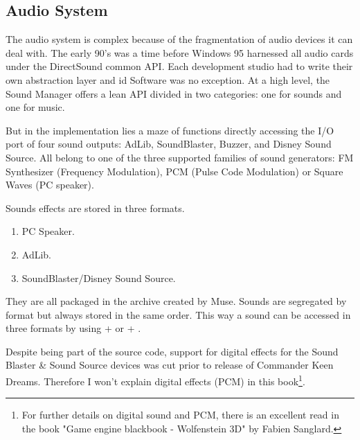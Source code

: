 \documentclass[book.tex]{subfiles}
\begin{document}
\subsection{Audio System}
The audio system is complex because of the fragmentation of audio devices it can deal with. The early 90's was a time before Windows 95 harnessed all audio cards under the DirectSound common API. Each development studio had to write their own abstraction layer and id Software was no exception. At a high level, the Sound Manager offers a lean API divided in two categories: one for sounds and one for music.\\
\par
\begin{minipage}{\textwidth}

\end{minipage}
\par
\begin{minipage}{\textwidth}

\end{minipage}
\par
\vspace{10pt}
But in the implementation lies a maze of functions directly accessing the I/O port of four sound outputs: AdLib, SoundBlaster, Buzzer, and Disney Sound Source. All belong to one of the three supported families of sound generators: FM Synthesizer (Frequency Modulation), PCM (Pulse Code Modulation) or Square Waves (PC speaker).\\
\par

\par
Sounds effects are stored in three formats.
\begin{enumerate}
\item PC Speaker.
\item AdLib.
\item SoundBlaster/Disney Sound Source. 
\end{enumerate}

They are all packaged in the  archive created by Muse. Sounds are segregated by format but always stored in the same order. This way a sound can be accessed in three formats by using  +  or  + .\\
\par

Despite being part of the source code, support for digital effects for the Sound Blaster \& Sound Source devices was cut prior to release of Commander Keen Dreams. Therefore I won't  explain digital effects (PCM) in this book\footnote{For further details on digital sound and PCM, there is an excellent read in the book "Game engine blackbook - Wolfenstein 3D" by Fabien Sanglard.}.
\end{document}
